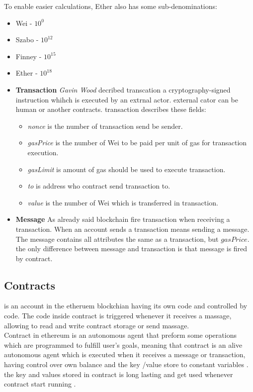To enable easier calculations, Ether also has some sub-denominations\cite{Egbertsen}:\\
\begin{itemize}
	\item Wei - $10^0$
	\item Szabo - $10^12$
	\item Finney - $10^15$
	\item Ether - $10^18$
\end{itemize}
\begin{itemize}
    \item \textbf{Transaction}
     \textit{Gavin Wood} decribed transcation a cryptography-signed instruction whihch is executed by an extrnal actor. external cator can be human or another contracts. transaction describes these fields:
     \begin{itemize}
         \item \textit{nonce} is the number of transaction send be sender.
         \item \textit{gasPrice} is the number of Wei to be paid per unit of gas for transaction execution.
         \item \textit{gasLimit} is amount of gas should be used to execute transaction.
         \item \textit{to} is address who contract send transaction to.
         \item \textit{value} is the number of Wei which is transferred in transaction.
     \end{itemize}
        \item \textbf{Message}
        As already said blockchain fire transaction when receiving a transaction. When an account sends a transaction means sending a message. The message contains all attributes the same as a transaction, but $gasPrice$. the only difference between message and transaction is that message is fired by contract\cite{Egbertsen}.
\end{itemize}
\subsection{Contracts}  is an account in the etheruem blockchian having its own code and controlled by code. The code inside contract is triggered whenever it receives a massage, allowing to read and write contract storage or send massage. \\
Contract in ethereum is an autonomous agent that preform some operations which are programmed to fulfill user's goals, meaning that contract is an alive autonomous agent which is executed when it receives a message or transaction,  having control over own balance and the key /value store to constant variables .
the key and values stored in contract is long lasting and get used whenever contract start running \cite{Egbertsen}.

